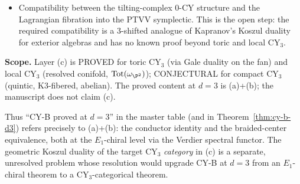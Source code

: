 \begin{remark}[CY-B at \texorpdfstring{$d=3$}{d=3}: precise scope of what is proved and what remains open]
\begin{enumerate}[label=\textup{(\alph*)}]
\begin{itemize}
 conifold transitions.
 \item[(iii)] Compatibility between the tilting-complex
 $0$-CY structure and the Lagrangian fibration into the PTVV
 symplectic. This is the open step: the required compatibility is
 a $3$-shifted analogue of Kapranov's Koszul duality for exterior
 algebras and has no known proof beyond toric and local CY$_3$.
 \end{itemize}
 \textbf{Scope.} Layer (c) is PROVED for toric CY$_3$ (via
 Gale duality on the fan) and local CY$_3$ (resolved conifold,
 $\mathrm{Tot}(\omega_{\P^2})$); CONJECTURAL for compact CY$_3$
 (quintic, K3-fibered, abelian). The proved content
 at $d=3$ is (a)+(b); the manuscript does not claim (c).
\end{enumerate}
Thus ``CY-B proved at $d=3$'' in the master table (and in
Theorem~\ref{thm:cy-b-d3}) refers precisely to (a)+(b): the conductor
identity and the braided-center equivalence, both at the $E_1$-chiral
level via the Verdier spectral functor. The geometric Koszul duality
of the target CY$_3$ \emph{category} in (c) is a separate, unresolved
problem whose resolution would upgrade CY-B at $d=3$ from an
$E_1$-chiral theorem to a CY$_3$-categorical theorem.
\end{remark}

